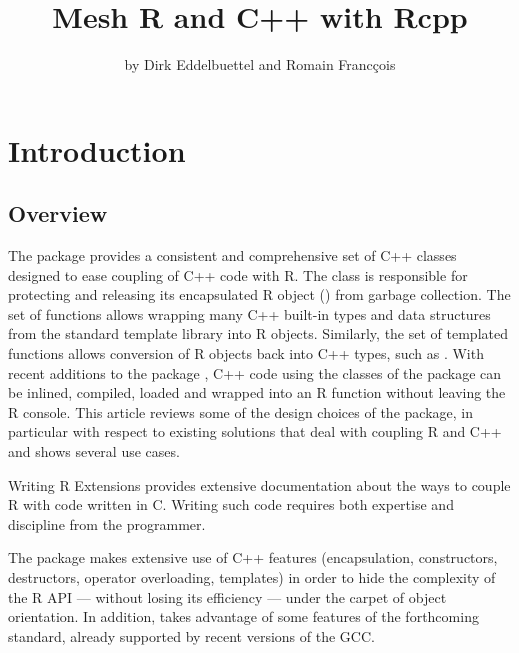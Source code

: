 \title{Mesh R and C++ with Rcpp}
\author{by Dirk Eddelbuettel and Romain Franc\c{c}ois}

\maketitle


\section{Introduction}

\subsection{Overview}
The  package provides a consistent and comprehensive set 
of C++ classes designed to ease coupling of C++ code
with R. The  class is responsible for 
protecting and releasing its encapsulated R object ()
from garbage collection. The  set of functions allows
wrapping many C++ built-in types and data structures from the standard
template library into R objects. Similarly, the  set of 
templated functions allows conversion of R objects back into C++
types, such as . With recent additions to the 
 package \citep{cran:inline}, 
C++ code using the classes of the 
 package can be inlined, compiled, loaded and wrapped 
into an R function without leaving the R console. 
This article reviews some of the design choices of the
 package, in particular with respect to existing solutions
that deal with coupling R and C++ and shows several use cases.

Writing R Extensions \citep{R:exts} provides extensive 
documentation about the ways to couple R with code written in C. 
Writing such code requires both expertise and discipline from the 
programmer.


The  package makes extensive use of C++ features (encapsulation, 
constructors, destructors, operator overloading, templates) in order
to hide the complexity of the R API --- without losing its 
efficiency --- under the carpet of object orientation. In addition, 
 takes advantage of some features of the forthcoming  
standard, already supported by recent versions of the GCC.

